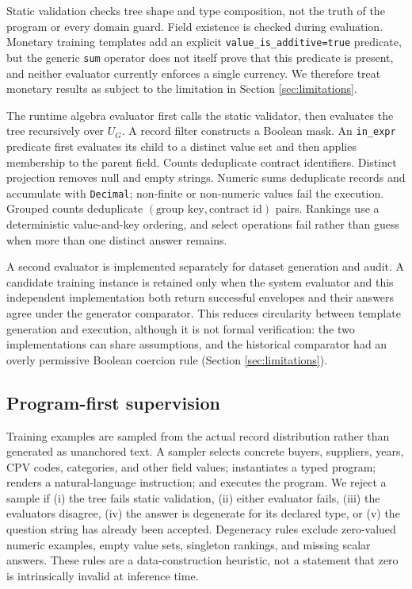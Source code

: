 Static validation checks tree shape and type composition, not the truth of the program or every
domain guard.  Field existence is checked during evaluation.  Monetary training templates add
an explicit \texttt{value\_is\_additive=true} predicate, but the generic \texttt{sum} operator
does not itself prove that this predicate is present, and neither evaluator currently enforces a
single currency.  We therefore treat monetary results as subject to the limitation in Section
\ref{sec:limitations}.

\label{sec:execution}
The runtime algebra evaluator first calls the static validator, then evaluates the tree
recursively over $U_G$.  A record filter constructs a Boolean mask.  An
\texttt{in\_expr} predicate first evaluates its child to a distinct value set and then applies
membership to the parent field.  Counts deduplicate contract identifiers.  Distinct projection
removes null and empty strings.  Numeric sums deduplicate records and accumulate with
\texttt{Decimal}; non-finite or non-numeric values fail the execution.  Grouped counts
deduplicate $(\text{group key},\text{contract id})$ pairs.  Rankings use a deterministic
value-and-key ordering, and select operations fail rather than guess when more than one distinct
answer remains.

A second evaluator is implemented separately for dataset generation and audit.  A candidate
training instance is retained only when the system evaluator and this independent implementation
both return successful envelopes and their answers agree under the generator comparator.  This
reduces circularity between template generation and execution, although it is not formal
verification: the two implementations can share assumptions, and the historical comparator had
an overly permissive Boolean coercion rule (Section \ref{sec:limitations}).

\subsection{Program-first supervision}
\label{sec:program-supervision}

Training examples are sampled from the actual record distribution rather than generated as
unanchored text.  A sampler selects concrete buyers, suppliers, years, CPV codes, categories, and
other field values; instantiates a typed program; renders a natural-language instruction; and
executes the program.  We reject a sample if (i) the tree fails static validation, (ii) either
evaluator fails, (iii) the evaluators disagree, (iv) the answer is degenerate for its declared
type, or (v) the question string has already been accepted.  Degeneracy rules exclude zero-valued
numeric examples, empty value sets, singleton rankings, and missing scalar answers.  These rules
are a data-construction heuristic, not a statement that zero is intrinsically invalid at
inference time.

